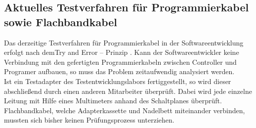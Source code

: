 \documentclass[a4paper,11pt]{scrartcl}
\begin{document}
\subsection{Aktuelles Testverfahren für Programmierkabel sowie Flachbandkabel}
Das derzeitige Testverfahren für Programmierkabel in der Softwareentwicklung erfolgt nach dem\glqq Try and Error – Prinzip \grqq{} . Kann der Softwareentwickler keine Verbindung mit den gefertigten Programmierkabeln zwischen Controller und Programer aufbauen, so muss das Problem zeitaufwendig analysiert werden.
\\
Ist ein Testadapter des Testentwicklungslabors fertiggestellt, so wird dieser abschließend durch einen anderen Mitarbeiter überprüft. Dabei wird jede einzelne Leitung mit Hilfe eines Multimeters anhand des Schaltplanes überprüft. Flachbandkabel, welche Adapterkassette und Nadelbett miteinander verbinden, mussten sich bisher keinen Prüfungsprozess unterziehen. 
\end{document}
